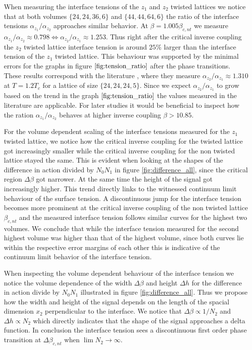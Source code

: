 \documentclass[english,twoside,openright]{UH_TCM_MSc}
\begin{document}
When measuring the interface tensions of the $z_1$ and $z_2$ twisted lattices we notice that at both volumes $\{24,24,36,6\}$ and $\{44,44,64,6\}$ the ratio of the interface tensions $\alpha_{z_1}/\alpha_{z_2}$ approaches similar behavior. At $\beta = 1.005 \beta_{c,nt}$ we measure $\alpha_{z_1}/\alpha_{z_2}\approx 0.798 \iff \alpha_{z_2}/\alpha_{z_1} \approx 1.253$. Thus right after the critical inverse coupling the $z_2$ twisted lattice interface tension is around $25\%$ larger than the interface tension of the $z_1$ twisted lattice. This behaviour was supported by the minimal errors for the graphs in figure $\ref{fig:tension_ratio}$ after the phase transitions. These results correspond with the literature \cite{DEFORCRAND2005647}, where they measure $\alpha_{z_2}/\alpha_{z_1} \approx 1.310$ at $T=1.2T_c$ for a lattice of size $\{24,24,24,5\}$. Since we expect $\alpha_{z_2}/\alpha_{z_1}$ to grow based on the trend in the graph $\ref{fig:tension_ratio}$ the values measured in the literature are applicable.  For later studies it would be beneficial to inspect how the ration $\alpha_{z_1}/\alpha_{z_2}$ behaves at higher inverse coupling $\beta > 10.85$.

For the volume dependent scaling of the interface tensions measured for the $z_1$ twisted lattice, we notice how the critical inverse coupling for the twisted lattice got increasingly smaller while the critical inverse coupling for the non twisted lattice stayed the same. This is evident when looking at the shapes of the difference in action divided by $N_0N_1$ in figure \ref{fig:difference_all}, since the critical region $\Delta \beta$ got narrower. At the same time the height of the signal got increasingly higher. This trend directly links to the witnessed continuum limit behaviour of the surface tension. A discontinuous jump for the interface tension becomes more prominent at the critical inverse coupling of the non twisted lattice $\beta_{c,nt}$ and the measured interface tension follows similar curves for the highest two volumes. We conclude that while the interface tension measured for the second highest volume was higher than that of the highest volume, since both curves lie within the respective error margins of each other this is indicative of the continuum limit behavior of the interface tension.

When inspecting the volume dependent behaviour of the interface tension we notice the volume dependence of the width $\Delta \beta$ and height $\Delta h$ for the difference in action divide by $N_0N_1$ illustrated in figure  \ref{fig:difference_all}. Thus we propose how the width and height of the signal depends on the length of the spacial dimension $x_2$ perpendicular to the interface. We notice that $\Delta \beta \propto 1/N_2$ and $\Delta h \propto N_2$ which directly indicates that the shape of the signal approaches a delta function. In conclusion the interface tension sees a discontinuous first order phase transition at $\Delta \beta_{c,nt}$ when $\lim N_2 \rightarrow \infty$. 
\end{document}
